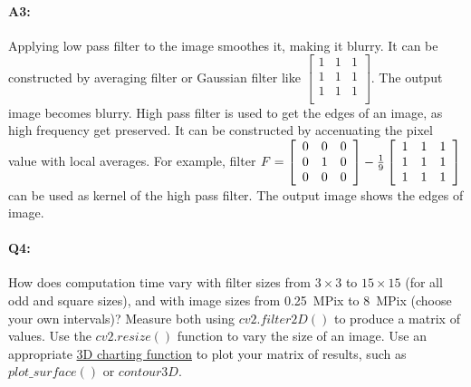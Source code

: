 	\paragraph{A3:} Applying low pass filter to the image smoothes it, making it blurry. It can be constructed by averaging filter or Gaussian filter like $ \left[
	\begin{array}{ccc}
		1 & 1 & 1 \\
		1 & 1 & 1 \\
		1 & 1 & 1 \\
	\end{array}
	\right]$. The output image becomes blurry. High pass filter is used to get the edges of an image, as high frequency get preserved. It can be constructed by accenuating the pixel value with local averages. For example, filter $F =  \left[
	\begin{array}{ccc}
		0 & 0 & 0 \\
		0 & 1 & 0 \\
		0 & 0 & 0 \\
	\end{array}
	\right] - {1\over 9} \left[
	\begin{array}{ccc}
		1 & 1 & 1 \\
		1 & 1 & 1 \\
		1 & 1 & 1 \\
	\end{array}
	\right]
	$ can be used as kernel of the high pass filter. The output image shows the edges of image. 
	
	
	
	
	\pagebreak
	\paragraph{Q4:} How does computation time vary with filter sizes from $3\times3$ to $15\times15$ (for all odd and square sizes), and with image sizes from 0.25~MPix to 8~MPix (choose your own intervals)? Measure both using \href{https://docs.opencv.org/4.5.0/d4/d86/group__imgproc__filter.html#ga27c049795ce870216ddfb366086b5a04}{$cv2.filter2D()$} to produce a matrix of values. Use the \href{https://docs.opencv.org/4.5.3/da/d54/group__imgproc__transform.html#ga47a974309e9102f5f08231edc7e7529d}{$cv2.resize()$} function to vary the size of an image.
	Use an appropriate \href{https://jakevdp.github.io/PythonDataScienceHandbook/04.12-three-dimensional-plotting.html#Three-dimensional-Contour-Plots}{3D charting function} to plot your matrix of results, such as $plot\_surface()$ or $contour3D$.
	
